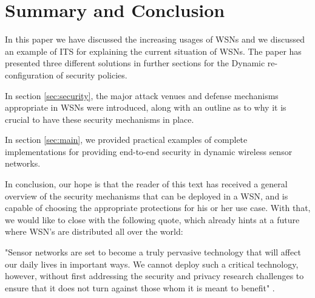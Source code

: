 \documentclass[12pt,a4paper,twoside]{report}
\begin{document}
\section{Summary and Conclusion}
\label{sec:conclusion}
In this paper we have discussed the increasing usages of WSNs and we discussed an example of ITS for explaining the current situation of WSNs. The paper has presented three different solutions in further sections for the Dynamic re-configuration of security policies.\par
In section \ref{sec:security}, the major attack venues and defense mechanisms appropriate in WSNs were introduced, along with an outline as to why it is crucial to have these security mechanisms in place. \par
In section \ref{sec:main}, we provided practical examples of complete implementations for providing end-to-end security in dynamic wireless sensor networks.\par
In conclusion, our hope is that the reader of this text has received a general overview of the security mechanisms that can be deployed in a WSN, and is capable of choosing the appropriate protections for his or her use case. With that, we would like to close with the following quote, which already hints at a future where WSN's are distributed all over the world: \par
"Sensor networks are set to become a truly pervasive technology that will affect our daily lives in important ways. We cannot deploy such a critical technology, however, without first addressing the security and privacy research challenges to ensure that it does not turn against those whom it is meant to benefit" \cite{chan;perrig:2003}.\par


\iffalse
\end{document}
